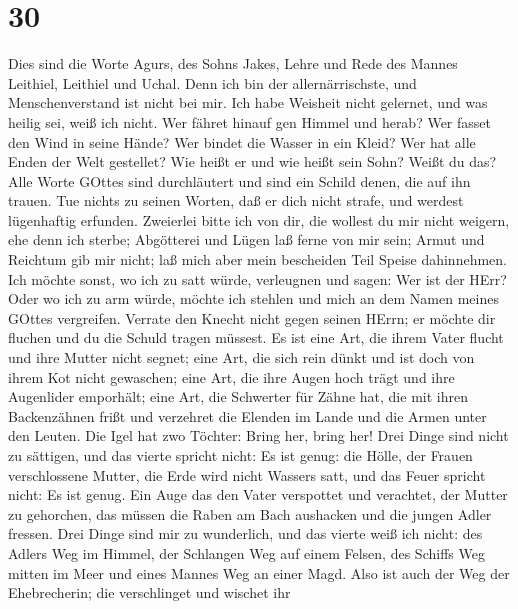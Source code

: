 \hypertarget{section-29}{%
\section{30}\label{section-29}}

 Dies sind die Worte Agurs, des Sohns Jakes, Lehre und Rede
des Mannes Leithiel, Leithiel und Uchal.  Denn ich bin der
allernärrischste, und Menschenverstand ist nicht bei mir. 
Ich habe Weisheit nicht gelernet, und was heilig sei, weiß ich nicht.
 Wer fähret hinauf gen Himmel und herab? Wer fasset den Wind
in seine Hände? Wer bindet die Wasser in ein Kleid? Wer hat alle Enden
der Welt gestellet? Wie heißt er und wie heißt sein Sohn? Weißt du das?
 Alle Worte GOttes sind durchläutert und sind ein Schild
denen, die auf ihn trauen.  Tue nichts zu seinen Worten, daß
er dich nicht strafe, und werdest lügenhaftig erfunden. 
Zweierlei bitte ich von dir, die wollest du mir nicht weigern, ehe denn
ich sterbe;  Abgötterei und Lügen laß ferne von mir sein;
Armut und Reichtum gib mir nicht; laß mich aber mein bescheiden Teil
Speise dahinnehmen.  Ich möchte sonst, wo ich zu satt würde,
verleugnen und sagen: Wer ist der HErr? Oder wo ich zu arm würde, möchte
ich stehlen und mich an dem Namen meines GOttes vergreifen.
 Verrate den Knecht nicht gegen seinen HErrn; er möchte dir
fluchen und du die Schuld tragen müssest.  Es ist eine Art,
die ihrem Vater flucht und ihre Mutter nicht segnet;  eine
Art, die sich rein dünkt und ist doch von ihrem Kot nicht gewaschen;
 eine Art, die ihre Augen hoch trägt und ihre Augenlider
emporhält;  eine Art, die Schwerter für Zähne hat, die mit
ihren Backenzähnen frißt und verzehret die Elenden im Lande und die
Armen unter den Leuten.  Die Igel hat zwo Töchter: Bring
her, bring her! Drei Dinge sind nicht zu sättigen, und das vierte
spricht nicht: Es ist genug:  die Hölle, der Frauen
verschlossene Mutter, die Erde wird nicht Wassers satt, und das Feuer
spricht nicht: Es ist genug.  Ein Auge das den Vater
verspottet und verachtet, der Mutter zu gehorchen, das müssen die Raben
am Bach aushacken und die jungen Adler fressen.  Drei Dinge
sind mir zu wunderlich, und das vierte weiß ich nicht:  des
Adlers Weg im Himmel, der Schlangen Weg auf einem Felsen, des Schiffs
Weg mitten im Meer und eines Mannes Weg an einer Magd. 
Also ist auch der Weg der Ehebrecherin; die verschlinget und wischet ihr

